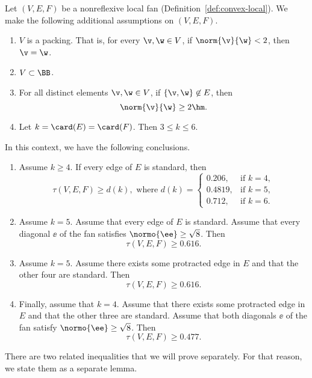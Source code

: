 \begin{theorem}\label{lemma:empty-d}
Let $(V,E,F)$ be a nonreflexive local fan (Definition~\ref{def:convex-local}).
We make the following additional
assumptions on $(V,E,F)$.
\begin{enumerate}
\item {} $V$ is a packing.  That is, for every $\v,\w\in
V$, if $\norm{\v}{\w}<2$, then $\v=\w$.
\item {} $V\subset \BB$.
\item {} For all distinct elements $\v,\w\in V$, if
$\{\v,\w\}\not\in E$, then 
\[ 
\norm{\v}{\w}\ge 2\hm.
\] 
\item {} 
Let   $k=\card(E)=\card(F)$.  Then $3\le k \le 6$.
\end{enumerate}
In this context, we have the following conclusions.
\begin{enumerate}
\item Assume $k\ge 4$.  If  every edge of $E$ is standard, then
\[ 
\tau(V,E,F) \ge d (k), \text{ where } d(k) =
\begin{cases}
  0.206,&\text{if }k=4,\\
  0.4819,&\text{if }k=5,\\
  0.712,&\text{if }k=6.
\end{cases}
\] 
\item Assume $k=5$.  Assume that every edge of $E$ is standard.
Assume that every diagonal $\ee$ of the fan satisfies $\normo{\ee}\ge\sqrt{8}$.
Then 
\[
\tau(V,E,F)\ge 0.616.
\]
\item Assume $k=5$.  Assume there exists some protracted edge in $E$ 
and that the other four are standard.  Then 
\[
\tau(V,E,F)\ge 0.616.
\]
\item Finally, assume that $k=4$.  Assume that there exists some protracted
 edge in $E$ and that the other three are standard.  
Assume that both diagonals $\ee$ of the fan satisfy $\normo{\ee}\ge\sqrt{8}$.
Then
\[
\tau(V,E,F)\ge 0.477.
\]
\end{enumerate}
\end{theorem}

There are two related inequalities that we will prove separately. For that reason,
we state them as a separate lemma.

